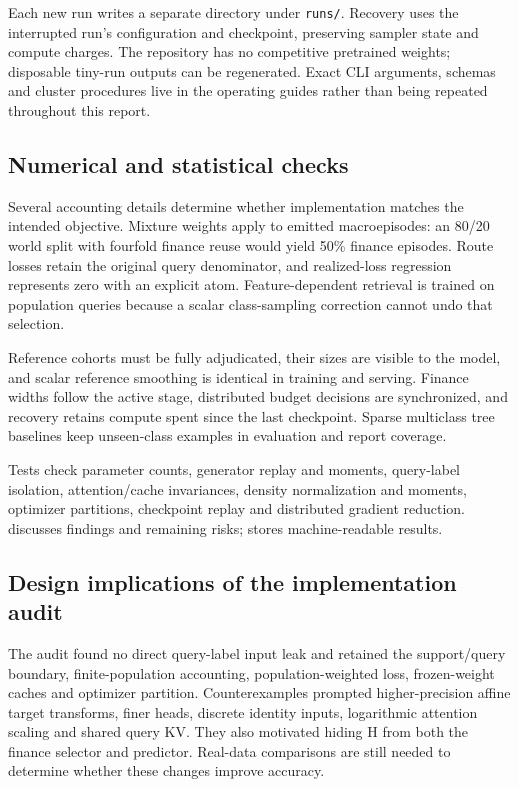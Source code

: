 \documentclass[11pt]{article}
\begin{document}
Each new run writes a separate directory under \texttt{runs/}. Recovery uses the interrupted run's configuration and checkpoint, preserving sampler state and compute charges. The repository has no competitive pretrained weights; disposable tiny-run outputs can be regenerated. Exact CLI arguments, schemas and cluster procedures live in the operating guides rather than being repeated throughout this report.

\subsection{Numerical and statistical checks}

Several accounting details determine whether implementation matches the intended objective. Mixture weights apply to emitted macroepisodes: an 80/20 world split with fourfold finance reuse would yield 50\% finance episodes. Route losses retain the original query denominator, and realized-loss regression represents zero with an explicit atom. Feature-dependent retrieval is trained on population queries because a scalar class-sampling correction cannot undo that selection.

Reference cohorts must be fully adjudicated, their sizes are visible to the model, and scalar reference smoothing is identical in training and serving. Finance widths follow the active stage, distributed budget decisions are synchronized, and recovery retains compute spent since the last checkpoint. Sparse multiclass tree baselines keep unseen-class examples in evaluation and report coverage.

Tests check parameter counts, generator replay and moments, query-label isolation, attention/cache invariances, density normalization and moments, optimizer partitions, checkpoint replay and distributed gradient reduction.  discusses findings and remaining risks;  stores machine-readable results.

\subsection{Design implications of the implementation audit}
\label{sec:independent-disposition}

The audit found no direct query-label input leak and retained the support/query boundary, finite-population accounting, population-weighted loss, frozen-weight caches and optimizer partition. Counterexamples prompted higher-precision affine target transforms, finer heads, discrete identity inputs, logarithmic attention scaling and shared query KV. They also motivated hiding H from both the finance selector and predictor. Real-data comparisons are still needed to determine whether these changes improve accuracy.
\end{document}
